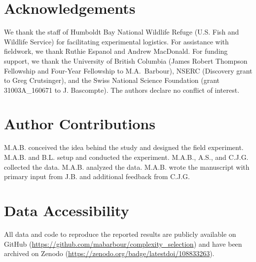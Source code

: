 \documentclass[11pt,]{article}
\begin{document}
\section{Acknowledgements}\label{acknowledgements}

We thank the staff of Humboldt Bay National Wildlife Refuge (U.S. Fish
and Wildlife Service) for facilitating experimental logistics. For
assistance with fieldwork, we thank Ruthie Espanol and Andrew MacDonald.
For funding support, we thank the University of British Columbia (James
Robert Thompson Fellowship and Four-Year Fellowship to M.A.~Barbour),
NSERC (Discovery grant to Greg Crutsinger), and the Swiss National
Science Foundation (grant 31003A\_160671 to J. Bascompte). The authors
declare no conflict of interest.

\section{Author Contributions}\label{author-contributions}

M.A.B. conceived the idea behind the study and designed the field
experiment. M.A.B. and B.L. setup and conducted the experiment. M.A.B.,
A.S., and C.J.G. collected the data. M.A.B. analyzed the data. M.A.B.
wrote the manuscript with primary input from J.B. and additional
feedback from C.J.G.

\section{Data Accessibility}\label{data-accessibility}

All data and code to reproduce the reported results are publicly
available on GitHub
(\url{https://github.com/mabarbour/complexity_selection}) and have been
archived on Zenodo (\url{https://zenodo.org/badge/latestdoi/108833263}).


\end{document}

